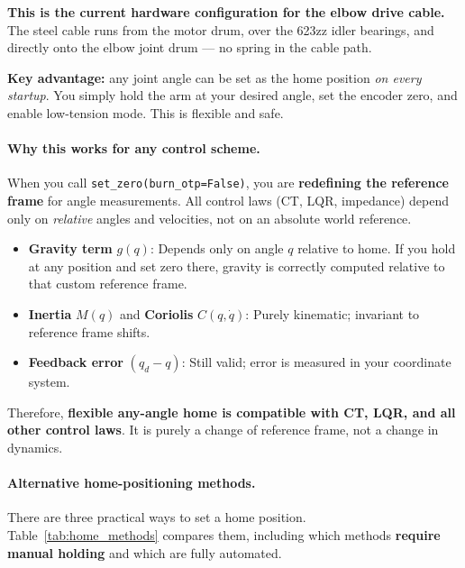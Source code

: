 \documentclass[11pt,a4paper]{article}
\begin{document}
\textbf{This is the current hardware configuration for the elbow drive cable.}
The steel cable runs from the motor drum, over the 623zz idler bearings, and
directly onto the elbow joint drum --- no spring in the cable path.

\textbf{Key advantage:} any joint angle can be set as the home position
\emph{on every startup}.  You simply hold the arm at your desired angle,
set the encoder zero, and enable low-tension mode.  This is flexible and safe.

\paragraph{Why this works for any control scheme.}
When you call \texttt{set\_zero(burn\_otp=False)}, you are \textbf{redefining the reference frame}
for angle measurements. All control laws (CT, LQR, impedance) depend only on
\emph{relative} angles and velocities, not on an absolute world reference.

\begin{itemize}[leftmargin=2em]
  \item \textbf{Gravity term} $g(q)$: Depends only on angle $q$ relative to home.
        If you hold at any position and set zero there, gravity is correctly
        computed relative to that custom reference frame.
  \item \textbf{Inertia} $M(q)$ and \textbf{Coriolis} $C(q,\dot{q})$: Purely kinematic;
        invariant to reference frame shifts.
  \item \textbf{Feedback error} $(q_d - q)$: Still valid; error is measured in your
        coordinate system.
\end{itemize}

Therefore, \textbf{flexible any-angle home is compatible with CT, LQR, and all
other control laws}. It is purely a change of reference frame, not a change in dynamics.

\paragraph{Alternative home-positioning methods.}
There are three practical ways to set a home position.
Table~\ref{tab:home_methods} compares them, including which methods
\textbf{require manual holding} and which are fully automated.
\end{document}
